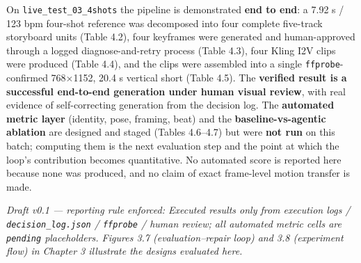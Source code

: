 \documentclass[10pt,twocolumn,letterpaper]{article}
\begin{document}
On \texttt{live\_test\_03\_4shots} the pipeline is demonstrated \textbf{end to end}: a 7.92 s / 123 bpm four-shot reference was decomposed into four complete five-track storyboard units (Table 4.2), four keyframes were generated and human-approved through a logged diagnose-and-retry process (Table 4.3), four Kling I2V clips were produced (Table 4.4), and the clips were assembled into a single \texttt{ffprobe}-confirmed 768$\times$1152, 20.4 s vertical short (Table 4.5). The \textbf{verified result is a successful end-to-end generation under human visual review}, with real evidence of self-correcting generation from the decision log. The \textbf{automated metric layer} (identity, pose, framing, beat) and the \textbf{baseline-vs-agentic ablation} are designed and staged (Tables 4.6--4.7) but were \textbf{not run} on this batch; computing them is the next evaluation step and the point at which the loop's contribution becomes quantitative. No automated score is reported here because none was produced, and no claim of exact frame-level motion transfer is made.

\emph{Draft v0.1 --- reporting rule enforced: Executed results only from execution logs / \texttt{decision\_log.json} / \texttt{ffprobe} / human review; all automated metric cells are \texttt{pending} placeholders. Figures 3.7 (evaluation--repair loop) and 3.8 (experiment flow) in Chapter 3 illustrate the designs evaluated here.}
\end{document}
